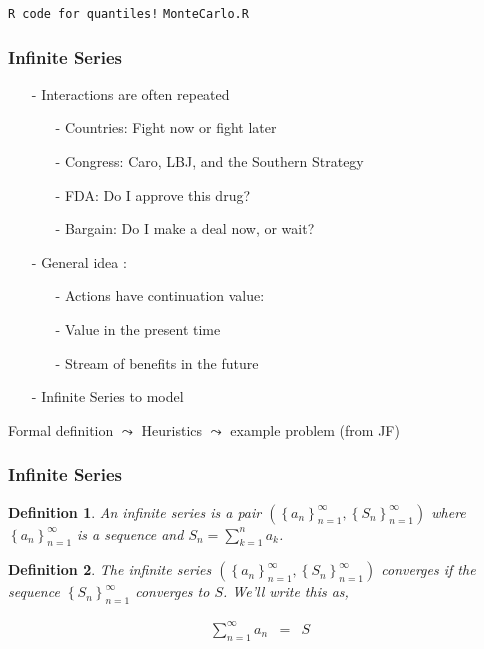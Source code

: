 \documentclass{beamer}
\newtheorem{defn}{Definition}
\numberwithin{equation}{section}
\begin{document}
\begin{frame}

{\tt R code for quantiles!}
{\tt MonteCarlo.R}
\end{frame}



\begin{frame}
\frametitle{Infinite Series}

\begin{itemize}
\item[-] Interactions are often \alert{repeated}
\begin{itemize}
\item[-] \alert{Countries}: Fight now or fight later
\item[-] \alert{Congress}: Caro, LBJ, and the Southern Strategy
\item[-] \alert{FDA}: Do I approve this drug?
\item[-] \alert{Bargain}: Do I make a deal now, or wait?
\end{itemize}
\item[-] General idea :
\begin{itemize}
\item[-] Actions have \alert{continuation value}: 
\item[-] Value in the present time
\item[-] Stream of benefits in the future
\end{itemize}
\item[-] \alert{Infinite Series} to model
\end{itemize}

Formal definition $\leadsto$ Heuristics $\leadsto$ example problem (from JF)

\end{frame}



\begin{frame}
\frametitle{Infinite Series} 

\begin{defn} An infinite series is a pair $(\left\{a_{n}\right\}_{n=1}^{\infty} , \left\{S_{n}\right\}_{n=1}^{\infty})$ where $\left\{a_{n}\right\}_{n=1}^{\infty}$ is a sequence and $S_{n} = \sum_{k=1}^{n} a_{k}$.   \end{defn}

\begin{defn} The infinite series $(\left\{a_{n}\right\}_{n=1}^{\infty} , \left\{S_{n}\right\}_{n=1}^{\infty})$ \alert{converges} if the \alert{sequence} $\left\{S_{n}\right\}_{n=1}^{\infty}$ converges to $S$.  We'll write this as, 


\begin{eqnarray}
\sum_{n=1}^{\infty} a_{n}  &= & S \nonumber 
\end{eqnarray}
\end{defn}

\end{frame}
\end{document}
